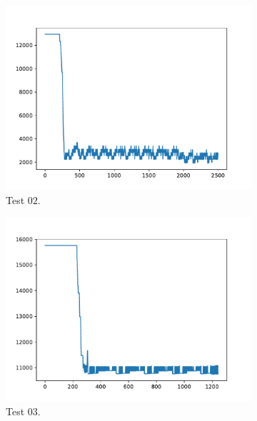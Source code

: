 \begin{figure}[h!]
\begin{subfigure}{0.45\textwidth}
        \includegraphics[width=\textwidth]{../logs/test02.pdf}
        \caption{Test $02$.}
    \end{subfigure}
    \begin{subfigure}{0.45\textwidth}
        \includegraphics[width=\textwidth]{../logs/test03.pdf}
        \caption{Test $03$.}
    \end{subfigure}
    \begin{subfigure}{0.45\textwidth}

\end{subfigure}
\end{figure}

